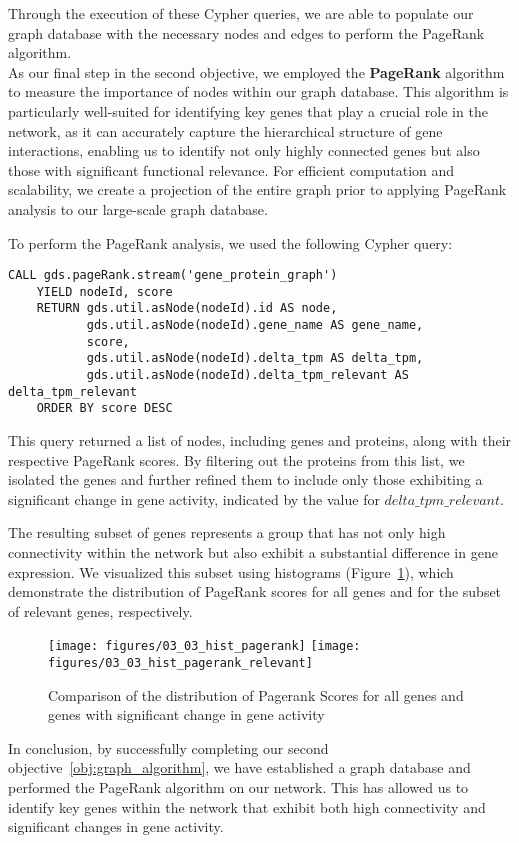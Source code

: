 Through the execution of these Cypher queries,
we are able to populate our graph database with the necessary nodes and edges to perform the PageRank algorithm.\\



As our final step in the second objective,
we employed the \textbf{PageRank} algorithm to measure the importance of nodes within our graph database.
This algorithm is particularly well-suited for identifying key genes that play a crucial role in the network,
as it can accurately capture the hierarchical structure of gene interactions,
enabling us to identify not only highly connected genes but also those with significant functional relevance.
For efficient computation and scalability,
we create a projection of the entire graph prior to applying PageRank analysis to our large-scale graph database.

To perform the PageRank analysis, we used the following Cypher query:
\begin{lstlisting}[language=Cypher, label={lst:pagerank}]
    CALL gds.pageRank.stream('gene_protein_graph')
    YIELD nodeId, score
    RETURN gds.util.asNode(nodeId).id AS node,
           gds.util.asNode(nodeId).gene_name AS gene_name,
           score,
           gds.util.asNode(nodeId).delta_tpm AS delta_tpm,
           gds.util.asNode(nodeId).delta_tpm_relevant AS delta_tpm_relevant
    ORDER BY score DESC
\end{lstlisting}

This query returned a list of nodes, including genes and proteins, along with their respective PageRank scores.
By filtering out the proteins from this list, we isolated the genes and
further refined them to include only those exhibiting a significant change in gene activity,
indicated by the value for $delta\_tpm\_relevant$.

The resulting subset of genes represents a group that has not only high connectivity
within the network but also exhibit a substantial difference in gene expression.
We visualized this subset using histograms (Figure~\ref{fig:03_02_hist_pagerank}),
which demonstrate the distribution of PageRank scores for all genes and for the subset of relevant genes, respectively.

\begin{figure}[h]
        \texttt{[image: figures/03\_03\_hist\_pagerank]}
    \endminipage
    \hfill
      \texttt{[image: figures/03\_03\_hist\_pagerank\_relevant]}
    \endminipage
    \caption{Comparison of the distribution of Pagerank Scores for all genes and genes with significant change in gene activity}
    \label{fig:03_02_hist_pagerank}
\end{figure}

In conclusion, by successfully completing our second objective~\ref{obj:graph_algorithm},
we have established a graph database and performed the PageRank algorithm on our network.
This has allowed us to identify key genes within the network that exhibit both high connectivity
and significant changes in gene activity.
